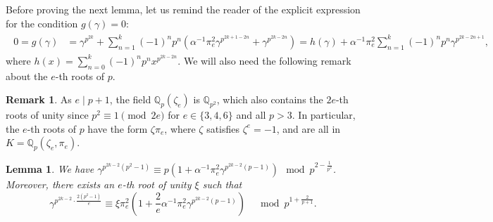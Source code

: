 \documentclass{amsart}
\newtheorem{lemma}[theorem]{Lemma}
\theoremstyle{definition}
\newtheorem{remark}[theorem]{Remark}
\newcommand{\Q}{\mathbb{Q}}
\numberwithin{theorem}{section}
\numberwithin{equation}{section}
\begin{document}
Before proving the next lemma, let us remind the reader of the explicit expression for the condition $g(\gamma)=0$:
\begin{align}\label{eq: g gamma is zero}
    \begin{split}
    0 = g(\gamma) &= \gamma^{p^{2k}}+ \sum_{n=1}^{k} (-1)^np^n (\alpha^{-1}\pi_e^2\gamma^{p^{2k+1-2n}} + \gamma^{p^{2k-2n}}) = h(\gamma) + \alpha^{-1}\pi_e^2 \sum_{n=1}^k (-1)^n p^n \gamma^{p^{2k-2n+1}},
    \end{split}
\end{align}
where $h(x)=\sum_{n=0}^k (-1)^n p^n x^{p^{2k-2n}}$. We will also need the following remark about the $e$-th roots of $p$.


\begin{remark}\label{rmk: 2eth roots of p}
As $e \mid p+1$, the field $\Q_p(\zeta_e)$ is $\Q_{p^2}$, which also contains the $2e$-th roots of unity since $p^2 \equiv 1 \pmod{2e}$ for $e \in \{3,4,6\}$ and all $p>3$.
In particular, the $e$-th roots of $p$ have the form $\zeta\pi_e$, where $\zeta$ satisfies $\zeta^e=-1$, and are all in $K= \Q_p(\zeta_e, \pi_e)$.
\end{remark}

\begin{lemma}\label{lemma: congruences powers of gamma}
We have $\gamma^{p^{2k-2}(p^2-1)} \equiv p(1 + \alpha^{-1} \pi_e^2 \gamma^{p^{2k-2}(p-1)}) \mod p^{2-\frac{1}{p^2}}$. Moreover, there exists an $e$-th root of unity $\xi$ such that
\[
\gamma^{p^{2k-2} \cdot \frac{2(p^2-1)}{e}} \equiv \xi \pi_e^2 \left(1 + \frac{2}{e}\alpha^{-1}\pi_e^2 \gamma^{p^{2k-2}(p-1)} \right) \quad \bmod{p^{1+ \frac{2}{p+1}}}.
\]
\end{lemma}
\end{document}
